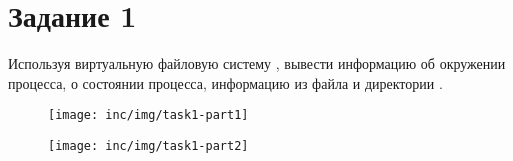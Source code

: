 \documentclass[a4paper,oneside,12pt]{extreport}
\begin{document}


\section*{Задание 1}
Используя виртуальную файловую систему , вывести информацию об окружении процесса, о состоянии процесса, информацию из файла  и директории .



\begin{figure}[h!]
	\centering
	\texttt{[image: inc/img/task1-part1]}
\end{figure}

\begin{figure}[h!]
	\centering
	\texttt{[image: inc/img/task1-part2]}
\end{figure}
\end{document}

